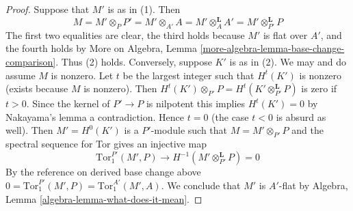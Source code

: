 \documentclass[10pt,a4paper]{amsart}
\theoremstyle{plain}
\theoremstyle{definition}
\theoremstyle{remark}
\numberwithin{equation}{subsection}
\begin{document}
\begin{proof}
Suppose that $M'$ is as in (1). Then
$$
M = M' \otimes_P P' = M' \otimes_{A'} A =
M' \otimes_A^\mathbf{L} A' = M' \otimes_{P'}^\mathbf{L} P
$$
The first two equalities are clear, the third holds because
$M'$ is flat over $A'$, and the fourth holds by
More on Algebra, Lemma \ref{more-algebra-lemma-base-change-comparison}.
Thus (2) holds. Conversely, suppose $K'$ is as in (2).
We may and do assume $M$ is nonzero.
Let $t$ be the largest integer such that $H^t(K')$ is nonzero
(exists because $M$ is nonzero).
Then $H^t(K') \otimes_{P'} P = H^t(K' \otimes_{P'}^\mathbf{L} P)$
is zero if $t > 0$. Since the kernel of $P' \to P$ is nilpotent
this implies $H^t(K') = 0$ by Nakayama's lemma a contradiction.
Hence $t = 0$ (the case $t < 0$ is absurd as well).
Then $M' = H^0(K')$ is a $P'$-module such that $M = M' \otimes_{P'} P$
and the spectral sequence for Tor gives an injective map
$$
\text{Tor}_1^{P'}(M', P) \to H^{-1}(M' \otimes_{P'}^\mathbf{L} P) = 0
$$
By the reference on derived base change above
$0 = \text{Tor}_1^{P'}(M', P) = \text{Tor}_1^{A'}(M', A)$.
We conclude that $M'$ is $A'$-flat by
Algebra, Lemma \ref{algebra-lemma-what-does-it-mean}.
\end{proof}
\end{document}
